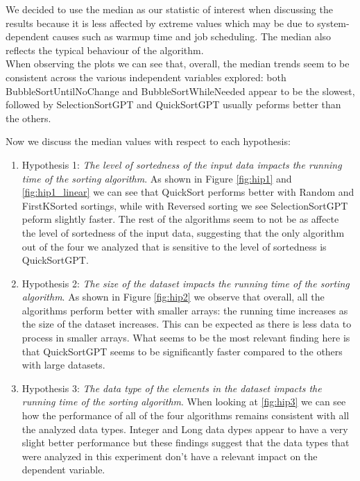 \documentclass[unicode,11pt,a4paper,oneside,numbers=endperiod,openany]{scrartcl}
\begin{document}
    We decided to use the median as our statistic of interest when discussing the results because it is less affected by extreme values which may be due to system-dependent causes such as warmup time and job scheduling. The median also reflects the typical behaviour of the algorithm. \\

    When observing the plots we can see that, overall, the median trends seem to be consistent across the various independent variables explored: both BubbleSortUntilNoChange and BubbleSortWhileNeeded appear to be the slowest, followed by SelectionSortGPT and QuickSortGPT usually peforms better than the others. 

    Now we discuss the median values with respect to each hypothesis:

    \begin{enumerate}
        \item Hypothesis 1: \textit{ The level of sortedness of the input data impacts the running time of the sorting algorithm}. As shown in Figure \ref{fig:hip1} and \ref{fig:hip1_linear} we can see that QuickSort performs better with Random and FirstKSorted sortings, while with Reversed sorting we see SelectionSortGPT peform slightly faster. The rest of the algorithms seem to not be as affecte the level of sortedness of the input data, suggesting that the only algorithm out of the four we analyzed that is sensitive to the level of sortedness is QuickSortGPT. 

        \item Hypothesis 2: \textit{The size of the dataset impacts the running time of the sorting algorithm}. As shown in Figure \ref{fig:hip2} we observe that overall, all the algorithms perform better with smaller arrays: the running time increases as the size of the dataset increases. This can be expected as there is less data to process in smaller arrays. What seems to be the most relevant finding here is that QuickSortGPT seems to be significantly faster compared to the others with large datasets.

        \item Hypothesis 3: \textit{The data type of the elements in the dataset impacts the running time of the sorting algorithm}. When looking at \ref{fig:hip3} we can see how the performance of all of the four algorithms remains consistent with all the analyzed data types. Integer and Long data dypes appear to have a very slight better performance but these findings suggest that the data types that were analyzed in this experiment don't have a relevant impact on the dependent variable.
    \end{enumerate}
\end{document}
